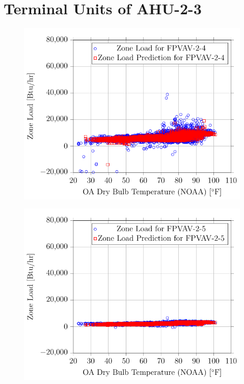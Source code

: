 \clearpage

\section{Terminal Units of AHU-2-3}

\begin{figure}
\centering
\includegraphics{Plots/15/2017-06-27-1319-BtuhrvsOADryBulbTemperatureNOAAF.pdf}
\caption{}
\label{fig:2017-06-27-1319-BtuhrvsOADryBulbTemperatureNOAAF}
\end{figure}

\begin{figure}
\centering
\includegraphics{Plots/16/2017-06-27-1322-BtuhrvsOADryBulbTemperatureNOAAF.pdf}
\caption{}
\label{fig:2017-06-27-1322-BtuhrvsOADryBulbTemperatureNOAAF}
\end{figure}

